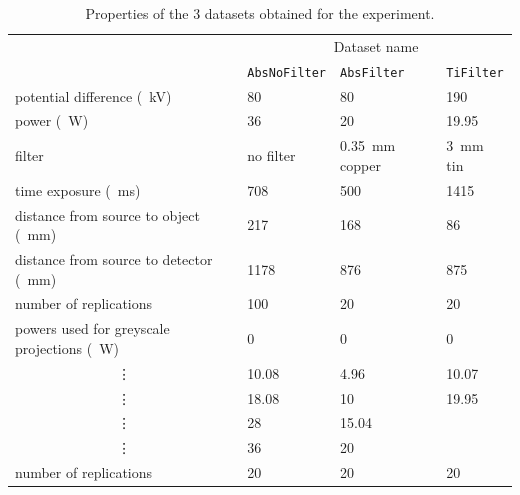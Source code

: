 \begin{table}
\centering
\begin{tabular}{l|lll}
                                                       & \multicolumn{3}{c}{Dataset name}                                                \\
                                                       & \texttt{AbsNoFilter} & \texttt{AbsFilter}             & \texttt{TiFilter}        \\ \hline
potential difference (\SI{}{\kilo\volt})               & 80                   & 80                             & 190                      \\
power (\SI{}{\watt})                                   & 36                   & 20                             & 19.95                    \\
filter                                                 & no filter            & \SI{0.35}{\milli\metre} copper & \SI{3}{\milli\metre} tin \\
time exposure (\SI{}{\milli\second})                   & 708                  & 500                            & 1415                     \\
distance from source to object (\SI{}{\milli\metre})   & 217                  & 168                            & 86                       \\
distance from source to detector (\SI{}{\milli\metre}) & 1178                 & 876                            & 875                      \\
number of replications                                 & 100                  & 20                             & 20                       \\ \hline
powers used for greyscale projections (\SI{}{\watt})   & 0                    & 0                              & 0                        \\
\multicolumn{1}{c|}{\vdots}                            & 10.08                & 4.96                           & 10.07                    \\
\multicolumn{1}{c|}{\vdots}                            & 18.08                & 10                             & 19.95                    \\
\multicolumn{1}{c|}{\vdots}                            & 28                   & 15.04                          &                          \\
\multicolumn{1}{c|}{\vdots}                            & 36                   & 20                             &                          \\
number of replications                                 & 20                   & 20                             & 20                      
\end{tabular}
\caption{Properties of the 3 datasets obtained for the experiment.}
\label{table:data_dataset}
\end{table}

